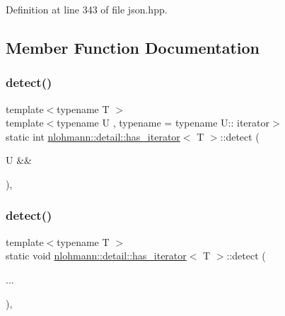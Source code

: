 Definition at line 343 of file json.\+hpp.



\subsection{Member Function Documentation}
\mbox{\label{structnlohmann_1_1detail_1_1has__iterator_a2977f1c63d04faa52d333396bb08e3b5}} 
\subsubsection{\texorpdfstring{detect()}{detect()}\hspace{0.1cm}{\footnotesize\ttfamily [1/2]}}
{\footnotesize\ttfamily template$<$typename T $>$ \\
template$<$typename U , typename  = typename U\+:: iterator$>$ \\
static int \hyperlink{structnlohmann_1_1detail_1_1has__iterator}{nlohmann\+::detail\+::has\+\_\+iterator}$<$ T $>$\+::detect (\begin{DoxyParamCaption}\item[{U \&\&}]{ }\end{DoxyParamCaption})\hspace{0.3cm}{\ttfamily [static]}, {\ttfamily [private]}}

\mbox{\label{structnlohmann_1_1detail_1_1has__iterator_a23fd69af6ccf0b408ce8cc7308887e1c}} 
\subsubsection{\texorpdfstring{detect()}{detect()}\hspace{0.1cm}{\footnotesize\ttfamily [2/2]}}
{\footnotesize\ttfamily template$<$typename T $>$ \\
static void \hyperlink{structnlohmann_1_1detail_1_1has__iterator}{nlohmann\+::detail\+::has\+\_\+iterator}$<$ T $>$\+::detect (\begin{DoxyParamCaption}\item[{}]{... }\end{DoxyParamCaption})\hspace{0.3cm}{\ttfamily [static]}, {\ttfamily [private]}}



